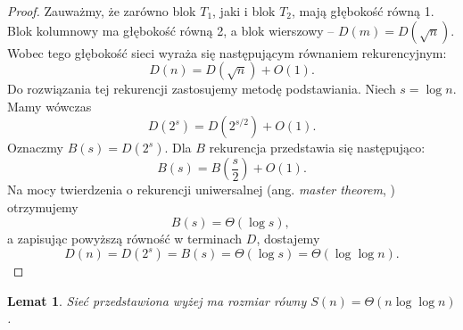 \documentclass[a4paper]{article}
\newcommand{\td}{\text{.}}
\newcommand{\tc}{\text{, }}
\newtheorem{lem}[tw]{Lemat}
\theoremstyle{definition}
\begin{document}
\begin{proof}
    Zauważmy, że zarówno blok \(T_1\), jaki i blok \(T_2\), mają głębokość równą 1. Blok kolumnowy ma głębokość równą 2, a blok wierszowy -- \(D(m) = D(\sqrt{n})\). Wobec tego głębokość sieci wyraża się następującym równaniem rekurencyjnym:
    \[
    D(n) = D(\sqrt n) + O(1) \td
    \]
    Do rozwiązania tej rekurencji zastosujemy metodę podstawiania. Niech \(s = \log n\). Mamy wówczas
    \[
    D(2^s) = D(2^{s/2}) + O(1) \td
    \]
    Oznaczmy \(B(s) = D(2^s)\). Dla \(B\) rekurencja przedstawia się następująco:
    \[
    B(s) = B\left(\frac s 2\right) + O(1) \td
    \]
    Na mocy twierdzenia o rekurencji uniwersalnej (ang. \textit{master theorem}, \cite{cormen}) otrzymujemy
    \[
    B(s) = \Theta(\log s) \tc
    \]
    a zapisując powyższą równość w terminach \(D\), dostajemy
    \[
    D(n) = D(2^s) = B(s) = \Theta(\log s) = \Theta(\log \log n) \td
    \]
\end{proof}

\begin{lem}
    Sieć przedstawiona wyżej ma rozmiar równy \(S(n) = \Theta(n \log \log n)\). 
\end{lem}
\end{document}

